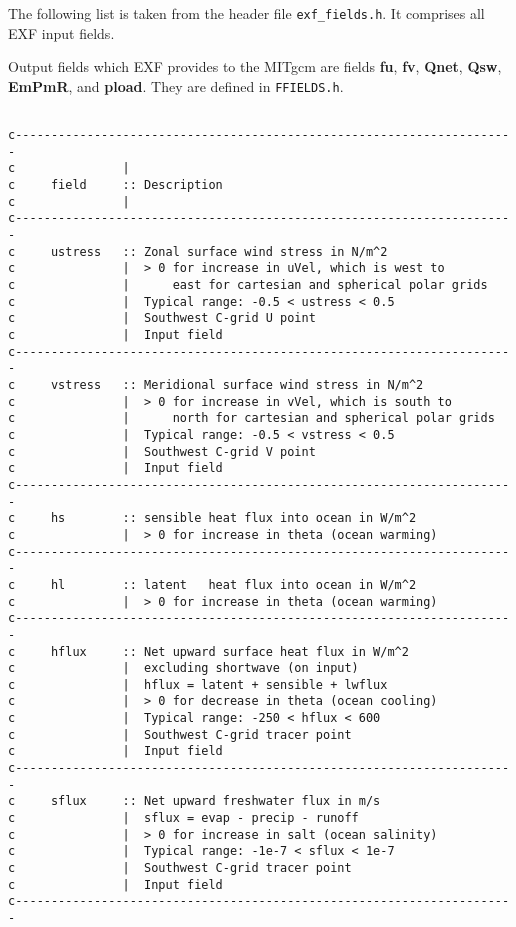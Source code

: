 The following list is taken from the header file \texttt{exf\_fields.h}.
It comprises all EXF input fields.

Output fields which EXF provides to the MITgcm are fields
\textbf{fu}, \textbf{fv}, \textbf{Qnet}, \textbf{Qsw}, \textbf{EmPmR},
and \textbf{pload}. They are defined in \texttt{FFIELDS.h}.

{\footnotesize
\begin{verbatim}

c----------------------------------------------------------------------
c               |
c     field     :: Description
c               |
c----------------------------------------------------------------------
c     ustress   :: Zonal surface wind stress in N/m^2
c               |  > 0 for increase in uVel, which is west to
c               |      east for cartesian and spherical polar grids
c               |  Typical range: -0.5 < ustress < 0.5
c               |  Southwest C-grid U point
c               |  Input field
c----------------------------------------------------------------------
c     vstress   :: Meridional surface wind stress in N/m^2
c               |  > 0 for increase in vVel, which is south to
c               |      north for cartesian and spherical polar grids
c               |  Typical range: -0.5 < vstress < 0.5
c               |  Southwest C-grid V point
c               |  Input field
c----------------------------------------------------------------------
c     hs        :: sensible heat flux into ocean in W/m^2
c               |  > 0 for increase in theta (ocean warming)
c----------------------------------------------------------------------
c     hl        :: latent   heat flux into ocean in W/m^2
c               |  > 0 for increase in theta (ocean warming)
c----------------------------------------------------------------------
c     hflux     :: Net upward surface heat flux in W/m^2 
c               |  excluding shortwave (on input)
c               |  hflux = latent + sensible + lwflux
c               |  > 0 for decrease in theta (ocean cooling)
c               |  Typical range: -250 < hflux < 600
c               |  Southwest C-grid tracer point
c               |  Input field
c----------------------------------------------------------------------
c     sflux     :: Net upward freshwater flux in m/s
c               |  sflux = evap - precip - runoff
c               |  > 0 for increase in salt (ocean salinity)
c               |  Typical range: -1e-7 < sflux < 1e-7
c               |  Southwest C-grid tracer point
c               |  Input field
c----------------------------------------------------------------------

\end{verbatim}}
